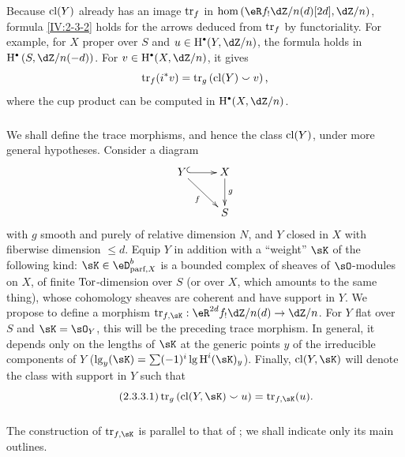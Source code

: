 Because $\operatorname{cl}(Y)$ already has an image $\operatorname{tr}_f$ in
$\hom\left(\eR f_!\dZ/n(d)[2 d],\dZ/n\right)$, formula
\ref{IV:2-3-2} holds for the arrows deduced from $\operatorname{tr}_f$ by functoriality.
For example, for $X$ proper over $S$ and
$u\in \h^\bullet(Y,\dZ/n)$, the formula holds in
$\h^\bullet\left(S,\dZ/n(-d)\right)$. For
$v\in \h^\bullet(X,\dZ/n)$, it gives
\[
  \operatorname{tr}_f(i^* v) = \operatorname{tr}_g\left(\operatorname{cl}(Y)\smallsmile v\right) \text{,}
\]
where the cup product can be computed in $\h^\bullet(X,\dZ/n)$.






\subsubsection{}\label{IV:2-3-3}

We shall define the trace morphisms, and hence the class $\operatorname{cl}(Y)$, under more
general hypotheses. Consider a diagram
\[\xymatrix{
  Y \ar@{^{(}->}[r] \ar[dr]_-f
    & X \ar[d]^-g \\
  & S
}\]
with $g$ smooth and purely of relative dimension $N$, and $Y$ closed in $X$
with fiberwise dimension $\leqslant d$. Equip $Y$ in addition with a
``weight'' $\sK$ of the following kind:
$\sK\in\eD_{\text{parf},X}^b$ is a bounded complex of sheaves of
$\sO$-modules on $X$, of finite $\operatorname{Tor}$-dimension over $S$ (or over $X$,
which amounts to the same thing), whose cohomology sheaves are coherent and
have support in $Y$. We propose to define a morphism
$\tr_{f,\sK}:\eR^{2 d}f_! \dZ/n(d) \to \dZ/n$. For $Y$ flat over $S$ and
$\sK=\sO_Y$, this will be the preceding trace morphism. In general, it
depends only on the lengths of $\sK$ at the generic points $y$ of the
irreducible components of
$Y$ ($\operatorname{lg}_y(\sK) = \sum (-1)^i \operatorname{lg} \h^i(\sK)_y$).
Finally, $\cl(Y,\sK)$ will denote the class with support in $Y$ such that
\begin{equation*}\tag{2.3.3.1}\label{IV:eq:2-3-3-1}
  \tr_g\left(\cl(Y,\sK)\smallsmile u\right) = \tr_{f,\sK}(u) \text{.}
\end{equation*}






\subsubsection{}\label{IV:2-3-4}

The construction of $\tr_{f,\sK}$ is parallel to that of
\cite[XVIII.2]{sga4}; we shall indicate only its main outlines.

